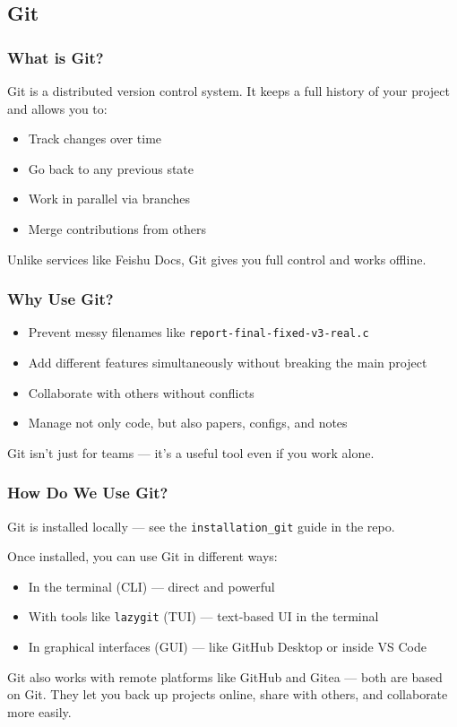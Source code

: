 \documentclass[aspectratio=169]{beamer}
\begin{document}
\subsection{Git}
\begin{frame}
  \frametitle{What is Git?}

  Git is a distributed version control system. It keeps a full history of your project and allows you to:
  \begin{itemize}
    \item Track changes over time
    \item Go back to any previous state
    \item Work in parallel via branches
    \item Merge contributions from others
  \end{itemize}

  \vspace{1em}
  Unlike services like Feishu Docs, Git gives you full control and works offline.
\end{frame}


\begin{frame}
  \frametitle{Why Use Git?}

  \begin{itemize}
    \item Prevent messy filenames like \texttt{report-final-fixed-v3-real.c}
    \item Add different features simultaneously without breaking the main project
    \item Collaborate with others without conflicts
    \item Manage not only code, but also papers, configs, and notes
  \end{itemize}

  \vspace{1em}
  Git isn’t just for teams — it’s a useful tool even if you work alone.
\end{frame}


\begin{frame}
  \frametitle{How Do We Use Git?}

  Git is installed locally — see the \texttt{installation\_git} guide in the repo.

  \vspace{1em}
  Once installed, you can use Git in different ways:
  \begin{itemize}
    \item In the terminal (CLI) — direct and powerful
    \item With tools like \texttt{lazygit} (TUI) — text-based UI in the terminal
    \item In graphical interfaces (GUI) — like GitHub Desktop or inside VS Code
  \end{itemize}

  \vspace{1em}
  Git also works with remote platforms like GitHub and Gitea — both are based on Git.  
  They let you back up projects online, share with others, and collaborate more easily.
\end{frame}
  
\end{document}
